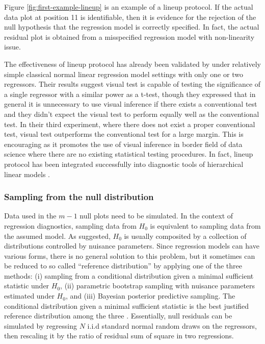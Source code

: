 \documentclass[]{interact}
\theoremstyle{plain}%
\theoremstyle{definition}
\theoremstyle{remark}
\begin{document}
Figure \ref{fig:first-example-lineup} is an example of a lineup
protocol. If the actual data plot at position 11 is identifiable, then
it is evidence for the rejection of the null hypothesis that the
regression model is correctly specified. In fact, the actual residual
plot is obtained from a misspecified regression model with non-linearity
issue.

The effectiveness of lineup protocol has already been validated by
\citet{majumder_validation_2013} under relatively simple classical
normal linear regression model settings with only one or two regressors.
Their results suggest visual test is capable of testing the significance
of a single regressor with a similar power as a t-test, though they
expressed that in general it is unnecessary to use visual inference if
there exists a conventional test and they didn't expect the visual test
to perform equally well as the conventional test. In their third
experiment, where there does not exist a proper conventional test,
visual test outperforms the conventional test for a large margin. This
is encouraging as it promotes the use of visual inference in border
field of data science where there are no existing statistical testing
procedures. In fact, lineup protocol has been integrated successfully
into diagnostic tools of hierarchical linear models
\citep{loy2013diagnostic}.

\hypertarget{sampling-from-the-null-distribution}{%
\subsubsection{Sampling from the null
distribution}\label{sampling-from-the-null-distribution}}

Data used in the \(m - 1\) null plots need to be simulated. In the
context of regression diagnostics, sampling data from \(H_0\) is
equivalent to sampling data from the assumed model. As
\citet{buja_statistical_2009} suggested, \(H_0\) is usually composited
by a collection of distributions controlled by nuisance parameters.
Since regression models can have various forms, there is no general
solution to this problem, but it sometimes can be reduced to so called
``reference distribution'' by applying one of the three methods: (i)
sampling from a conditional distribution given a minimal sufficient
statistic under \(H_0\), (ii) parametric bootstrap sampling with
nuisance parameters estimated under \(H_0\), and (iii) Bayesian
posterior predictive sampling. The conditional distribution given a
minimal sufficient statistic is the best justified reference
distribution among the three \citep{buja_statistical_2009}. Essentially,
null residuals can be simulated by regressing \(N\) i.i.d standard
normal random draws on the regressors, then rescaling it by the ratio of
residual sum of square in two regressions.
\end{document}
